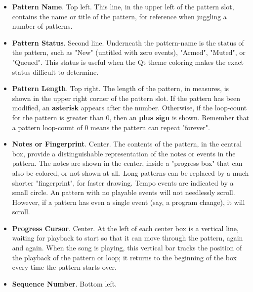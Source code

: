   \begin{itemize}
      \item \textbf{Pattern Name}. Top left.
         This line, in the upper left of the pattern slot, contains the name or
         title of the pattern, for reference when juggling a number of
         patterns.
      \item \textbf{Pattern Status}. Second line.
         Underneath the pattern-name is the status of the pattern, such as
         "New" (untitled with zero events), "Armed", "Muted", or "Queued".
         This status is useful when the Qt theme coloring makes the exact
         status difficult to determine.
      \item \textbf{Pattern Length}. Top right.
         The length of the pattern, in measures, is shown in the upper
         right corner of the pattern slot.
         If the pattern has been modified, an \textbf{asterisk}
         appears after the
         number.
         Otherwise, if the loop-count for the pattern is greater than 0, 
         then an \textbf{plus sign} is shown.
         Remember that a pattern loop-count of 0 means the pattern can repeat
         "forever".
      \item \textbf{Notes or Fingerprint}. Center.
         The contents of the pattern, in the central box,
         provide a distinguishable representation of the notes or events in the
         pattern.
         The notes are shown in the center, inside a "progress box" that
         can also be colored, or not shown at all.
         Long patterns can be replaced by a much shorter "fingerprint", for
         faster drawing.
         Tempo events are indicated by a small circle.
         An pattern with no playable events will not needlessly scroll.
         However, if a pattern has even a single event (say, a program change),
         it will scroll.
      \item \textbf{Progress Cursor}. Center.
         At the left of each center box is a vertical line, waiting for
         playback to start so that it can move through the pattern, again and
         again.
         When the song is playing, this vertical bar
         tracks the position of the playback of the pattern or loop; it
         returns to the beginning of the box every time the pattern starts
         over.
      \item \textbf{Sequence Number}. Bottom left.

\end{itemize}
